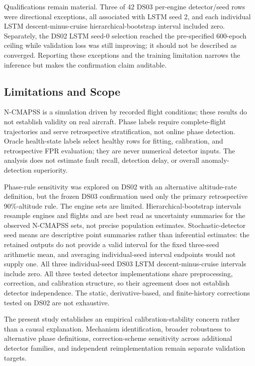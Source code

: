 \documentclass[preprint,12pt]{elsarticle}
\begin{document}
Qualifications remain material. Three of 42 DS03 per-engine detector/seed rows were directional exceptions, all associated with LSTM seed 2, and each individual LSTM descent-minus-cruise hierarchical-bootstrap interval included zero. Separately, the DS02 LSTM seed-0 selection reached the pre-specified 600-epoch ceiling while validation loss was still improving; it should not be described as converged. Reporting these exceptions and the training limitation narrows the inference but makes the confirmation claim auditable.

\subsection{Limitations and Scope}\label{limitations-and-scope}

N-CMAPSS is a simulation driven by recorded flight conditions; these results do not establish validity on real aircraft. Phase labels require complete-flight trajectories and serve retrospective stratification, not online phase detection. Oracle health-state labels select healthy rows for fitting, calibration, and retrospective FPR evaluation; they are never numerical detector inputs. The analysis does not estimate fault recall, detection delay, or overall anomaly-detection superiority.

Phase-rule sensitivity was explored on DS02 with an alternative altitude-rate definition, but the frozen DS03 confirmation used only the primary retrospective 90\%-altitude rule. The engine sets are limited. Hierarchical-bootstrap intervals resample engines and flights and are best read as uncertainty summaries for the observed N-CMAPSS sets, not precise population estimates. Stochastic-detector seed means are descriptive point summaries rather than inferential estimates: the retained outputs do not provide a valid interval for the fixed three-seed arithmetic mean, and averaging individual-seed interval endpoints would not supply one. All three individual-seed DS03 LSTM descent-minus-cruise intervals include zero. All three tested detector implementations share preprocessing, correction, and calibration structure, so their agreement does not establish detector independence. The static, derivative-based, and finite-history corrections tested on DS02 are not exhaustive.

The present study establishes an empirical calibration-stability concern rather than a causal explanation. Mechanism identification, broader robustness to alternative phase definitions, correction-scheme sensitivity across additional detector families, and independent reimplementation remain separate validation targets.
\end{document}
